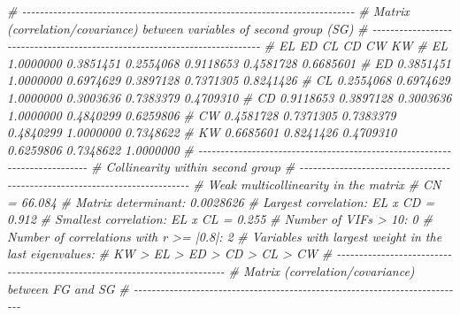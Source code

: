 \documentclass[
]{book}
\newenvironment{Shaded}{\begin{snugshade}}{\end{snugshade}}
\newcommand{\CommentTok}[1]{\textcolor[rgb]{0.56,0.35,0.01}{\textit{#1}}}
\numberwithin{equation}{section}
\begin{document}
\begin{Shaded}
\begin{Highlighting}[]
\CommentTok{\# {-}{-}{-}{-}{-}{-}{-}{-}{-}{-}{-}{-}{-}{-}{-}{-}{-}{-}{-}{-}{-}{-}{-}{-}{-}{-}{-}{-}{-}{-}{-}{-}{-}{-}{-}{-}{-}{-}{-}{-}{-}{-}{-}{-}{-}{-}{-}{-}{-}{-}{-}{-}{-}{-}{-}{-}{-}{-}{-}{-}{-}{-}{-}{-}{-}{-}{-}{-}{-}{-}{-}{-}{-}{-}{-}}
\CommentTok{\# Matrix (correlation/covariance) between variables of second group (SG)}
\CommentTok{\# {-}{-}{-}{-}{-}{-}{-}{-}{-}{-}{-}{-}{-}{-}{-}{-}{-}{-}{-}{-}{-}{-}{-}{-}{-}{-}{-}{-}{-}{-}{-}{-}{-}{-}{-}{-}{-}{-}{-}{-}{-}{-}{-}{-}{-}{-}{-}{-}{-}{-}{-}{-}{-}{-}{-}{-}{-}{-}{-}{-}{-}{-}{-}{-}{-}{-}{-}{-}{-}{-}{-}{-}{-}{-}{-}}
\CommentTok{\#           EL        ED        CL        CD        CW        KW}
\CommentTok{\# EL 1.0000000 0.3851451 0.2554068 0.9118653 0.4581728 0.6685601}
\CommentTok{\# ED 0.3851451 1.0000000 0.6974629 0.3897128 0.7371305 0.8241426}
\CommentTok{\# CL 0.2554068 0.6974629 1.0000000 0.3003636 0.7383379 0.4709310}
\CommentTok{\# CD 0.9118653 0.3897128 0.3003636 1.0000000 0.4840299 0.6259806}
\CommentTok{\# CW 0.4581728 0.7371305 0.7383379 0.4840299 1.0000000 0.7348622}
\CommentTok{\# KW 0.6685601 0.8241426 0.4709310 0.6259806 0.7348622 1.0000000}
\CommentTok{\# {-}{-}{-}{-}{-}{-}{-}{-}{-}{-}{-}{-}{-}{-}{-}{-}{-}{-}{-}{-}{-}{-}{-}{-}{-}{-}{-}{-}{-}{-}{-}{-}{-}{-}{-}{-}{-}{-}{-}{-}{-}{-}{-}{-}{-}{-}{-}{-}{-}{-}{-}{-}{-}{-}{-}{-}{-}{-}{-}{-}{-}{-}{-}{-}{-}{-}{-}{-}{-}{-}{-}{-}{-}{-}{-}}
\CommentTok{\# Collinearity within second group }
\CommentTok{\# {-}{-}{-}{-}{-}{-}{-}{-}{-}{-}{-}{-}{-}{-}{-}{-}{-}{-}{-}{-}{-}{-}{-}{-}{-}{-}{-}{-}{-}{-}{-}{-}{-}{-}{-}{-}{-}{-}{-}{-}{-}{-}{-}{-}{-}{-}{-}{-}{-}{-}{-}{-}{-}{-}{-}{-}{-}{-}{-}{-}{-}{-}{-}{-}{-}{-}{-}{-}{-}{-}{-}{-}{-}{-}{-}}
\CommentTok{\# Weak multicollinearity in the matrix}
\CommentTok{\# CN = 66.084}
\CommentTok{\# Matrix determinant: 0.0028626 }
\CommentTok{\# Largest correlation: EL x CD = 0.912 }
\CommentTok{\# Smallest correlation: EL x CL = 0.255 }
\CommentTok{\# Number of VIFs \textgreater{} 10: 0 }
\CommentTok{\# Number of correlations with r \textgreater{}= |0.8|: 2 }
\CommentTok{\# Variables with largest weight in the last eigenvalues: }
\CommentTok{\# KW \textgreater{} EL \textgreater{} ED \textgreater{} CD \textgreater{} CL \textgreater{} CW }
\CommentTok{\# {-}{-}{-}{-}{-}{-}{-}{-}{-}{-}{-}{-}{-}{-}{-}{-}{-}{-}{-}{-}{-}{-}{-}{-}{-}{-}{-}{-}{-}{-}{-}{-}{-}{-}{-}{-}{-}{-}{-}{-}{-}{-}{-}{-}{-}{-}{-}{-}{-}{-}{-}{-}{-}{-}{-}{-}{-}{-}{-}{-}{-}{-}{-}{-}{-}{-}{-}{-}{-}{-}{-}{-}{-}{-}{-}}
\CommentTok{\# Matrix (correlation/covariance) between FG and SG}
\CommentTok{\# {-}{-}{-}{-}{-}{-}{-}{-}{-}{-}{-}{-}{-}{-}{-}{-}{-}{-}{-}{-}{-}{-}{-}{-}{-}{-}{-}{-}{-}{-}{-}{-}{-}{-}{-}{-}{-}{-}{-}{-}{-}{-}{-}{-}{-}{-}{-}{-}{-}{-}{-}{-}{-}{-}{-}{-}{-}{-}{-}{-}{-}{-}{-}{-}{-}{-}{-}{-}{-}{-}{-}{-}{-}{-}{-}}

\end{Highlighting}
\end{Shaded}
\end{document}
